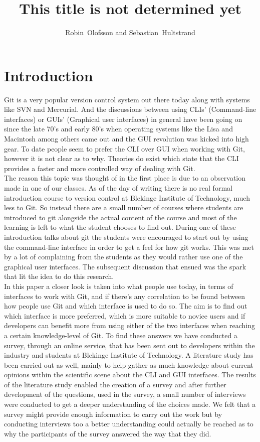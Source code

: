 \documentclass[a4paper,oneside]{bth} %
\begin{document}
		\cleardoublepage
		\pagestyle{headings}
		
		\title{This title is not determined yet}
		\author{Robin~Olofsson and Sebastian~Hultstrand}
		
		\chapter{Introduction}
		Git is a very popular version control system out there today along with systems like SVN and Mercurial. And the discussions between using CLIs' (Command-line interfaces) or GUIs' (Graphical user interfaces) in general have been going on since the late 70's and early 80's when operating systems like the Lisa and Macintosh among others came out \cite{HistoryOfGUIWiki} and the GUI revolution was kicked into high gear.
		To date people seem to prefer the CLI over GUI when working with Git, however it is not clear as to why.
		Theories do exist which state that the CLI provides a faster and more controlled way of dealing with Git. \cite{GitUserSurvey}\cite{GitInClassroom}
		\\
		The reason this topic was thought of in the first place is due to an observation made in one of our classes. As of the day of writing there is no real formal introduction course to version control at Blekinge Institute of Technology, much less to Git. So instead there are a small number of courses where students are introduced to git alongside the actual content of the course and most of the learning is left to what the student chooses to find out.
		During one of these introduction talks about git the students were encouraged to start out by using the command-line interface in order to get a feel for how git works. This was met by a lot of complaining from the students as they would rather use one of the graphical user interfaces. The subsequent discussion that ensued was the spark that lit the idea to do this research.
		\\
		In this paper a closer look is taken into what people use today, in terms of interfaces to work with Git, and if there's any correlation to be found between how people use Git and which interface is used to do so.
		The aim is to find out which interface is more preferred, which is more suitable to novice users and if developers can benefit more from using either of the two interfaces when reaching a certain knowledge-level of Git.
		To find these answers we have conducted a survey, through an online service, that has been sent out to developers within the industry and students at Blekinge Institute of Technology.
		A literature study has been carried out as well, mainly to help  gather as much knowledge about current opinions within the scientific scene about the CLI and GUI interfaces.
		The results of the literature study enabled the creation of a  survey and after further development of the questions, used in the survey, a small number of interviews were conducted to get a deeper understanding of the choices made.
		We felt that a survey might provide enough information to carry out the work but by conducting interviews too a better understanding could actually be reached as to why the participants of the survey answered the way that they did.
		
\end{document}
